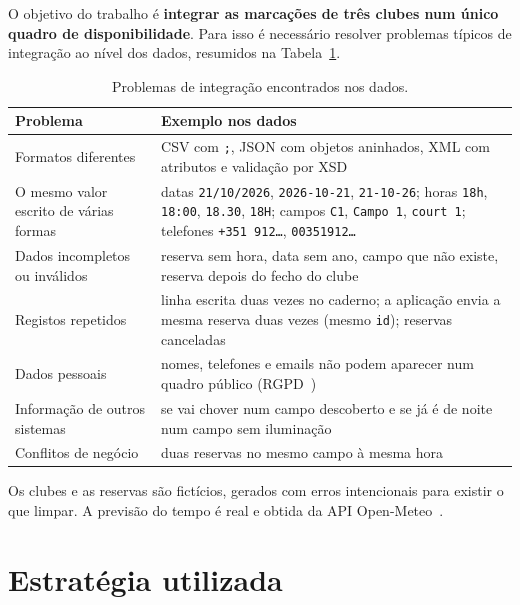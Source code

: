 \documentclass[11pt,a4paper]{article}
\begin{document}
O objetivo do trabalho é \textbf{integrar as marcações de três clubes num único quadro de disponibilidade}. Para isso é necessário resolver problemas típicos de integração ao nível dos dados, resumidos na Tabela~\ref{tab:problemas}.

\begin{table}[H]
\centering
\caption{Problemas de integração encontrados nos dados.}
\label{tab:problemas}
\small
\renewcommand{\arraystretch}{1.25}
\begin{tabular}{@{}p{4.2cm}p{10.6cm}@{}}
\toprule
\textbf{Problema} & \textbf{Exemplo nos dados} \\
\midrule
Formatos diferentes & CSV com \texttt{;}, JSON com objetos aninhados, XML com atributos e validação por XSD \\
O mesmo valor escrito de várias formas & datas \texttt{21/10/2026}, \texttt{2026-10-21}, \texttt{21-10-26}; horas \texttt{18h}, \texttt{18:00}, \texttt{18.30}, \texttt{18H}; campos \texttt{C1}, \texttt{Campo 1}, \texttt{court 1}; telefones \texttt{+351 912\ldots}, \texttt{00351912\ldots} \\
Dados incompletos ou inválidos & reserva sem hora, data sem ano, campo que não existe, reserva depois do fecho do clube \\
Registos repetidos & linha escrita duas vezes no caderno; a aplicação envia a mesma reserva duas vezes (mesmo \texttt{id}); reservas canceladas \\
Dados pessoais & nomes, telefones e emails não podem aparecer num quadro público (RGPD~\cite{rgpd}) \\
Informação de outros sistemas & se vai chover num campo descoberto e se já é de noite num campo sem iluminação \\
Conflitos de negócio & duas reservas no mesmo campo à mesma hora \\
\bottomrule
\end{tabular}
\end{table}

Os clubes e as reservas são fictícios, gerados com erros intencionais para existir o que limpar. A previsão do tempo é real e obtida da API Open-Meteo~\cite{openmeteo}.

\section{Estratégia utilizada}
\end{document}
